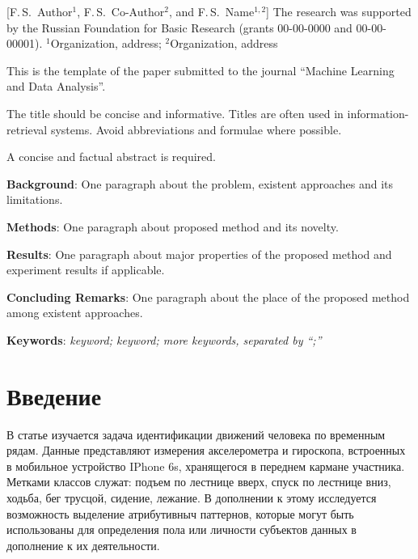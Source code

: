 \documentclass[12pt, twoside]{article}
\begin{document}
    [F.\,S.~Author$^1$, F.\,S.~Co-Author$^2$, and F.\,S.~Name$^{1, 2}$] %
\thanksEng
    {The research was
    	 supported by the Russian Foundation for Basic Research (grants 00-00-0000 and 00-00-00001).
    }
\organizationEng
    {$^1$Organization, address; $^2$Organization, address}
\abstractEng
    {This is the template of the paper submitted to the journal ``Machine Learning and Data Analysis''.
		
	\noindent
	The title should be concise and informative. Titles are often used in information-retrieval systems. Avoid abbreviations and formulae where possible.
	
	\noindent
	A concise and factual abstract is required.
	
	\noindent
	\textbf{Background}: One paragraph about the problem, existent approaches and its limitations.
	
	\noindent
	\textbf{Methods}: One paragraph about proposed method and its novelty.
	
	\noindent
	\textbf{Results}: One paragraph about major properties of the proposed method and experiment results if applicable.
	
	\noindent
	\textbf{Concluding Remarks}: One paragraph about the place of the proposed method among existent approaches.
		
	\noindent
		
	\noindent
    	\textbf{Keywords}: \emph{keyword; keyword; more keywords, separated by ``;''}}


\maketitle
\linenumbers

\section{Введение}
В статье изучается задача идентификации движений человека по временным рядам. Данные представляют измерения акселерометра и гироскопа, встроенных в мобильное устройство IPhone 6s, хранящегося в переднем кармане участника. Метками классов служат: подъем по лестнице вверх, спуск по лестнице вниз, ходьба, бег трусцой, сидение, лежание. В дополнении к этому исследуется возможность выделение атрибутивныч паттернов, которые могут быть использованы для определения пола или личности субъектов данных в дополнение к их деятельности.
\end{document}

